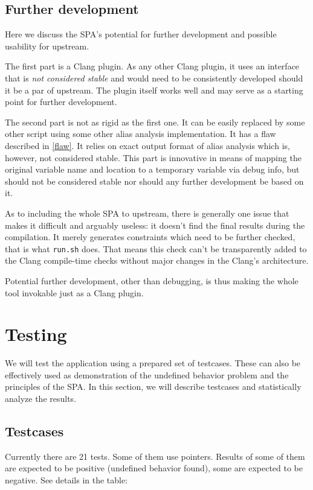 \subsection{Further development}
Here we discuss the SPA's potential for further development and possible usability for upstream.

The first part is a Clang plugin. As any other Clang plugin, it uses an interface that is \emph{not considered stable} and would need to be consistently developed should it be a par of upstream. The plugin itself works well and may serve as a starting point for further development.

The second part is not as rigid as the first one. It can be easily replaced by some other script using some other alias analysis implementation. It has a flaw described in \ref{flaw}. It relies on exact output format of alias analysis which is, however, not considered stable. This part is innovative in means of mapping the original variable name and location to a temporary variable via debug info, but should not be considered stable nor should any further development be based on it.

As to including the whole SPA to upstream, there is generally one issue that makes it difficult and arguably useless: it doesn't find the final results during the compilation. It merely generates constraints which need to be further checked, that is what \verb|run.sh| does. That means this check can't be transparently added to the Clang compile-time checks without major changes in the Clang's architecture.

Potential further development, other than debugging, is thus making the whole tool invokable just as a Clang plugin.
\section{Testing}
We will test the application using a prepared set of testcases. These can also be effectively used as demonstration of the undefined behavior problem and the principles of the SPA.
In this section, we will describe testcases and statistically analyze the results.
\subsection{Testcases}
Currently there are 21 tests. Some of them use pointers. Results of some of them are expected to be positive (undefined behavior found), some are expected to be negative. See details in the table:\\

